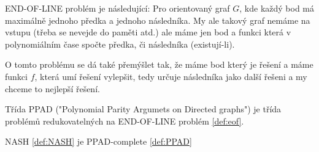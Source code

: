 \begin{definition}
\label{def:eof}
END-OF-LINE problém je následující: Pro orientovaný graf $G$, kde každý bod má maximálně jednoho předka a jednoho následníka. 
My ale takový graf nemáme na vstupu (třeba se nevejde do paměti atd.) ale máme jen bod a funkci která v polynomiálním čase spočte předka, či následníka (existují-li). 

O tomto problému se dá také přemýšlet tak, že máme bod který je řešení a máme funkci $f$, která umí řešení vylepšit, tedy určuje následníka jako další řešeni a my chceme to nejlepší řešení. 
\end{definition}
\begin{definition}
\label{def:PPAD}
Třída PPAD ("Polynomial Parity Argumets on Directed graphs") je třída problémů redukovatelných na END-OF-LINE problém \ref{def:eof}. 
\end{definition}

\begin{theorem}
\label{thm:nash_ppad}
NASH \ref{def:NASH} je PPAD-complete \ref{def:PPAD}
\end{theorem}
